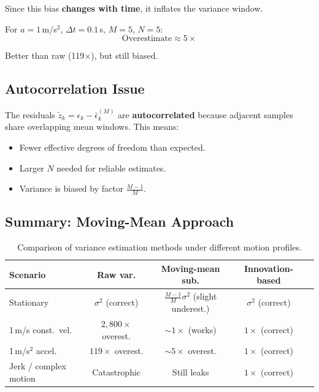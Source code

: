 \documentclass[11pt,a4paper]{article}
\begin{document}
Since this bias \textbf{changes with time}, it inflates the variance window.

For $a = 1$\,m/s$^2$, $\Delta t = 0.1$\,s, $M=5$, $N=5$:
\begin{equation}
    \text{Overestimate} \approx 5\times
\end{equation}

Better than raw (119$\times$), but still biased.

\subsection{Autocorrelation Issue}

The residuals $\tilde{z}_k = \epsilon_k - \bar{\epsilon}_k^{(M)}$ are \textbf{autocorrelated} because adjacent samples share overlapping mean windows. This means:
\begin{itemize}
    \item Fewer effective degrees of freedom than expected.
    \item Larger $N$ needed for reliable estimates.
    \item Variance is biased by factor $\frac{M-1}{M}$.
\end{itemize}

\subsection{Summary: Moving-Mean Approach}

\begin{table}[H]
\centering
\begin{tabular}{@{}lcccc@{}}
\toprule
\textbf{Scenario} & \textbf{Raw var.} & \textbf{Moving-mean sub.} & \textbf{Innovation-based} \\
\midrule
Stationary            & $\sigma^2$ (correct) & $\frac{M-1}{M}\sigma^2$ (slight underest.) & $\sigma^2$ (correct) \\
1\,m/s const.\ vel.   & $2{,}800\times$ overest. & $\sim 1\times$ (works) & $1\times$ (correct) \\
1\,m/s$^2$ accel.     & $119\times$ overest.     & $\sim 5\times$ overest. & $1\times$ (correct) \\
Jerk / complex motion & Catastrophic             & Still leaks             & $1\times$ (correct) \\
\bottomrule
\end{tabular}
\caption{Comparison of variance estimation methods under different motion profiles.}
\end{table}
\end{document}
